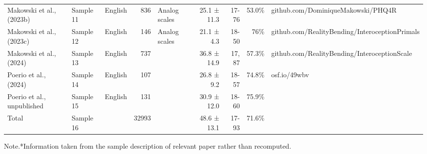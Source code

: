 \begin{table}[t]
\begin{tabular*}{\linewidth}{@{\extracolsep{\fill}}lllrlrrrl}
Makowski et al., (2023b) & Sample 11 & English & 836 & Analog scales & 25.1 ± 11.3 & 17-76 & 53.0\% & github.com/DominiqueMakowski/PHQ4R \\ 
Makowski et al., (2023c) & Sample 12 & English & 146 & Analog scales & 21.1 ± 4.3 & 18-50 & 76\% & github.com/RealityBending/InteroceptionPrimals \\ 
Makowski et al., (2024) & Sample 13 & English & 737 &  & 36.8 ± 14.9 & 17, 87 & 57.3\% & github.com/RealityBending/InteroceptionScale \\ 
Poerio et al., (2024) & Sample 14 & English & 107 &  & 26.8 ± 9.2 & 18-57 & 74.8\% & osf.io/49wbv \\ 
Poerio et al., unpublished & Sample 15 & English & 131 &  & 30.9 ± 12.0 & 18-60 & 75.9\% &  \\ 
Total & Sample 16 &  & 32993 &  & 48.6 ± 13.1 & 17-93 & 71.6\% &  \\ 
\bottomrule
\end{tabular*}
\begin{minipage}{\linewidth}
Note.*Information taken from the sample description of relevant paper rather than recomputed.\\
\end{minipage}
\end{table}

